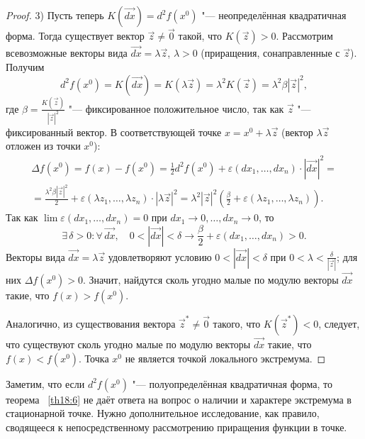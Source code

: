 \begin{proof}
3) Пусть теперь $K(\overrightarrow{dx}) = d^2f(x^0)$ "--- неопределённая квадратичная форма. Тогда существует вектор $\vec{z} \ne \vec{0}$ такой, что $K(\vec{z}) > 0$. Рассмотрим всевозможные векторы вида $\overrightarrow{dx} = \lambda\vec{z}$, $\lambda > 0$ (приращения, сонаправленные с $\vec{z}$). Получим
$$
d^2f(x^0) = K(\overrightarrow{dx}) = K(\lambda\vec{z}) = \lambda^2K(\vec{z}) = \lambda^2\beta|\vec{z}|^2,
$$
где $\beta = \frac{K(\vec{z})}{|\vec{z}|^2}$ "--- фиксированное положительное число, так как $\vec{z}$ "--- фиксированный вектор. В соответствующей точке $x = x^0 + \lambda\vec{z}$ (вектор $\lambda\vec{z}$ отложен из точки $x^0$):
\begin{multline*}
\Delta f(x^0) = f(x) - f(x^0) = \frac{1}{2}d^2f(x^0) + \varepsilon(dx_1, \ldots, dx_n) \cdot |\overrightarrow{dx}|^2 = \\
= \frac{\lambda^2\beta|\vec{z}|^2}{2} + \varepsilon(\lambda z_1, \ldots, \lambda z_n) \cdot |\lambda\vec{z}|^2 = \lambda^2|\vec{z}|^2\left(\frac{\beta}{2} + \varepsilon(\lambda z_1, \ldots, \lambda z_n)\right).
\end{multline*}
Так как $\lim \varepsilon(dx_1, \ldots, dx_n) = 0$ при $dx_1 \to 0, \ldots, dx_n \to 0$, то
$$
\exists\, \delta > 0 \colon \forall\, \overrightarrow{dx}, \quad 0 < |\overrightarrow{dx}| < \delta \longrightarrow \frac{\beta}{2} + \varepsilon(dx_1, \ldots, dx_n) > 0.
$$
Векторы вида $\overrightarrow{dx} = \lambda\vec{z}$ удовлетворяют условию $0 < |\overrightarrow{dx}| < \delta$ при $0 < \lambda < \frac{\delta}{|\vec{z}|}$; для них $\Delta f(x^0) > 0$. Значит, найдутся сколь угодно малые по модулю векторы $\overrightarrow{dx}$ такие, что $f(x) > f(x^0)$.

Аналогично, из существования вектора $\vec{z}^* \ne \vec{0}$ такого, что $K(\vec{z}^*) < 0$, следует, что существуют сколь угодно малые по модулю векторы $\overrightarrow{dx}$ такие, что $f(x) < f(x^0)$. Точка $x^0$ не является точкой локального экстремума.
\end{proof}

Заметим, что если $d^2f(x^0)$ "--- полуопределённая квадратичная форма, то теорема ~\ref{th18:6} не даёт ответа на вопрос о наличии и характере экстремума в стационарной точке. Нужно дополнительное исследование, как правило, сводящееся к непосредственному рассмотрению приращения функции в точке.